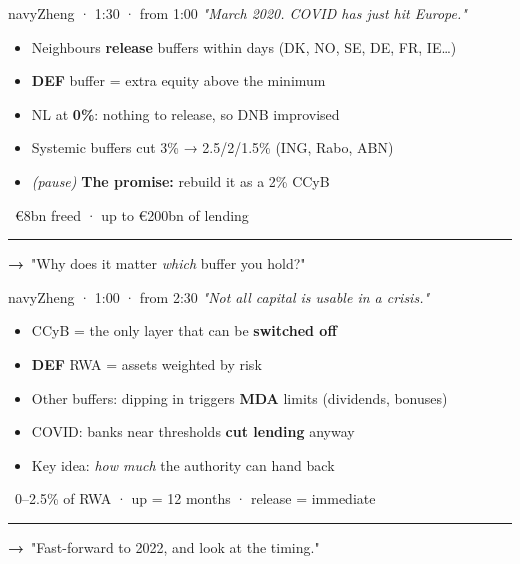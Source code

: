 \documentclass[10pt]{article}
\begin{document}
\begin{card}{navy}{\hfill{\normalsize\mdseries Zheng · 1:30 · from 1:00}}
{\large\itshape "March 2020. COVID has just hit Europe."}\par\smallskip
\begin{itemize}[label=\textcolor{navy}{\textbullet}]\item Neighbours \textbf{release} buffers within days (DK, NO, SE, DE, FR, IE…)\item \textcolor{gold!80!black}{\textbf{DEF}} buffer = extra equity above the minimum\item NL at \textbf{0\%}: nothing to release, so DNB improvised\item Systemic buffers cut 3\% → 2.5/2/1.5\% (ING, Rabo, ABN)\item \emph{(pause)} \textbf{The promise:} rebuild it as a 2\% CCyB\end{itemize}
\smallskip{\color{navy}\textbf{\#}}\ €8bn freed · up to €200bn of lending\par
\vfill\textcolor{grey}{\rule{\linewidth}{0.3pt}}\par{\bfseries\color{navy}→}\ "Why does it matter \emph{which} buffer you hold?"
\end{card}
\hfill
\begin{card}{navy}{\hfill{\normalsize\mdseries Zheng · 1:00 · from 2:30}}
{\large\itshape "Not all capital is usable in a crisis."}\par\smallskip
\begin{itemize}[label=\textcolor{navy}{\textbullet}]\item CCyB = the only layer that can be \textbf{switched off}\item \textcolor{gold!80!black}{\textbf{DEF}} RWA = assets weighted by risk\item Other buffers: dipping in triggers \textbf{MDA} limits (dividends, bonuses)\item COVID: banks near thresholds \textbf{cut lending} anyway\item Key idea: \emph{how much} the authority can hand back\end{itemize}
\smallskip{\color{navy}\textbf{\#}}\ 0–2.5\% of RWA · up = 12 months · release = immediate\par
\vfill\textcolor{grey}{\rule{\linewidth}{0.3pt}}\par{\bfseries\color{navy}→}\ "Fast-forward to 2022, and look at the timing."
\end{card}
\end{document}

